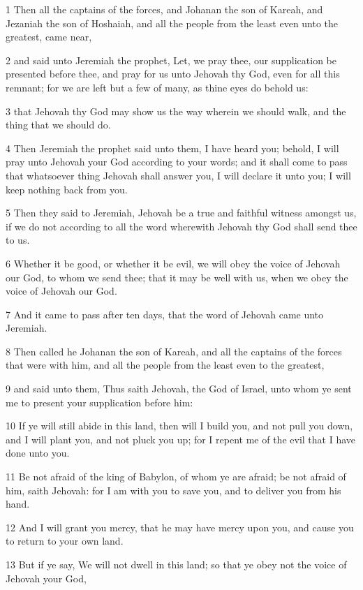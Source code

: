 \par 1 Then all the captains of the forces, and Johanan the son of Kareah, and Jezaniah the son of Hoshaiah, and all the people from the least even unto the greatest, came near,
\par 2 and said unto Jeremiah the prophet, Let, we pray thee, our supplication be presented before thee, and pray for us unto Jehovah thy God, even for all this remnant; for we are left but a few of many, as thine eyes do behold us:
\par 3 that Jehovah thy God may show us the way wherein we should walk, and the thing that we should do.
\par 4 Then Jeremiah the prophet said unto them, I have heard you; behold, I will pray unto Jehovah your God according to your words; and it shall come to pass that whatsoever thing Jehovah shall answer you, I will declare it unto you; I will keep nothing back from you.
\par 5 Then they said to Jeremiah, Jehovah be a true and faithful witness amongst us, if we do not according to all the word wherewith Jehovah thy God shall send thee to us.
\par 6 Whether it be good, or whether it be evil, we will obey the voice of Jehovah our God, to whom we send thee; that it may be well with us, when we obey the voice of Jehovah our God.
\par 7 And it came to pass after ten days, that the word of Jehovah came unto Jeremiah.
\par 8 Then called he Johanan the son of Kareah, and all the captains of the forces that were with him, and all the people from the least even to the greatest,
\par 9 and said unto them, Thus saith Jehovah, the God of Israel, unto whom ye sent me to present your supplication before him:
\par 10 If ye will still abide in this land, then will I build you, and not pull you down, and I will plant you, and not pluck you up; for I repent me of the evil that I have done unto you.
\par 11 Be not afraid of the king of Babylon, of whom ye are afraid; be not afraid of him, saith Jehovah: for I am with you to save you, and to deliver you from his hand.
\par 12 And I will grant you mercy, that he may have mercy upon you, and cause you to return to your own land.
\par 13 But if ye say, We will not dwell in this land; so that ye obey not the voice of Jehovah your God,
